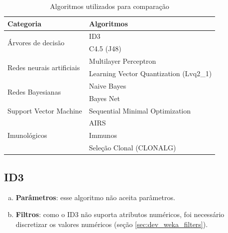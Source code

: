 \vspace{0.5cm}
\begin{table}[h]
    \centering
    \caption{Algoritmos utilizados para comparação}
    \label{tbl:dev_algs}
    \vspace{0.5cm}
    \begin{tabular}{|l|l|}
        \hline
        \textbf{Categoria}                         & \textbf{Algoritmos}                    \\
        \hline
        \multirow{2}{*}{Árvores de decisão}        & ID3                                    \\ \cline{2-2}
                                                   & C4.5 (J48)                             \\
        \hline
        \multirow{2}{*}{Redes neurais artificiais} & Multilayer Perceptron                  \\ \cline{2-2}
                                                   & Learning Vector Quantization (Lvq2\_1) \\
        \hline
        \multirow{2}{*}{Redes Bayesianas}          & Naive Bayes                            \\ \cline{2-2}
                                                   & Bayes Net                              \\
        \hline
        Support Vector Machine                     & Sequential Minimal Optimization        \\
        \hline
        \multirow{3}{*}{Imunológicos}              & AIRS                                   \\ \cline{2-2}
                                                   & Immunos                                \\ \cline{2-2}
                                                   & Seleção Clonal (CLONALG)               \\
        \hline
    \end{tabular}
\end{table}
\vspace{0.5cm}

\subsection{ID3}

\begin{enumerate}[a)]
    \item \textbf{Parâmetros}: esse algoritmo não aceita parâmetros.
    \item \textbf{Filtros}: como o ID3 não suporta atributos numéricos, foi necessário discretizar os valores numéricos (seção \ref{sec:dev_weka_filters}).
\end{enumerate}

